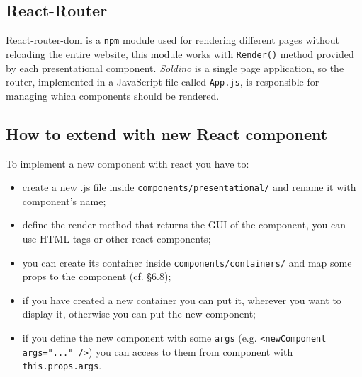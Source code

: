 \subsection{React-Router} 
React-router-dom is a \texttt{npm} module used for rendering different pages without reloading the entire website, this module works with \texttt{Render()} method provided by each presentational component. \textit{Soldino} is a single page application, so the router, implemented in a JavaScript file called \texttt{App.js}, is responsible for managing which components should be rendered.
\subsection{How to extend with new React component}
To implement a new component with react you have to:
\begin{itemize}
	\item create a new .js file inside \texttt{components/presentational/} and rename it with component's name;
	\item define the render method that returns the GUI of the component, you can use HTML tags or other react components;
	\item you can create its container inside \texttt{components/containers/} and map some props to the component (cf. §6.8);
	\item if you have created a new container you can put it, wherever you want to display it, otherwise you can put the new component;
	\item if you define the new component with some \texttt{args} (e.g. \texttt{<newComponent args="..." />}) you can access to them from component with \texttt{this.props.args}.
\end{itemize}

